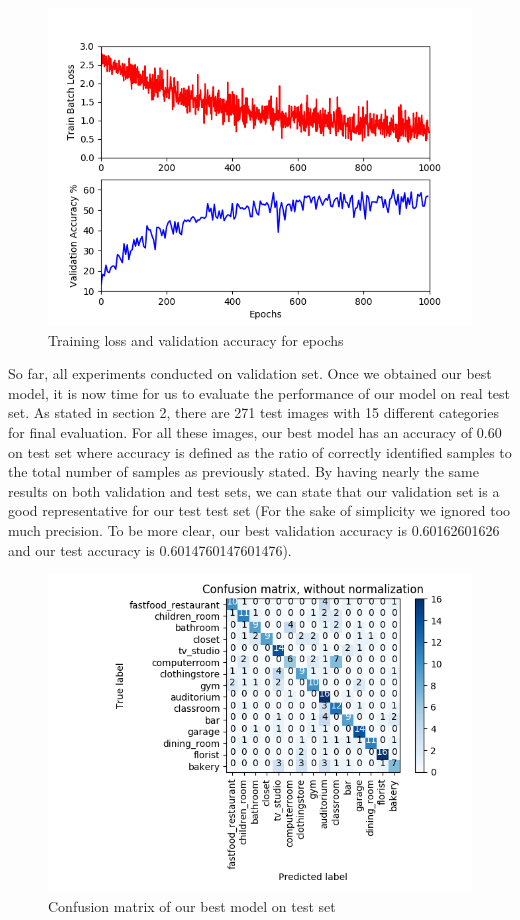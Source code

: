 \documentclass{article}
\begin{document}
\begin{figure}
  \includegraphics[width=\linewidth]{myTrainingProcess.png}
  \caption{Training loss and validation accuracy for epochs}
  \label{fig:myTrainingProcess}
\end{figure}

So far, all experiments conducted on validation set. Once we obtained our best model, it is now time for us to evaluate the performance of our model on real test set. As stated in section 2, there are 271 test images with 15 different categories for final evaluation. For all these images, our best model has an accuracy of 0.60 on test set where accuracy is defined as the ratio of correctly identified samples to the total number of samples as previously stated. By having nearly the same results on both validation and test sets, we can state that our validation set is a good representative for our test test set (For the sake of simplicity we ignored too much precision. To be more clear, our best validation accuracy is 0.60162601626 and our test accuracy is 0.6014760147601476).

\begin{figure}
  \includegraphics[width=\linewidth]{myConfusionMatrix.png}
  \caption{Confusion matrix of our best model on test set}
  \label{fig:myConfusionMatrix}
\end{figure}
\end{document}
